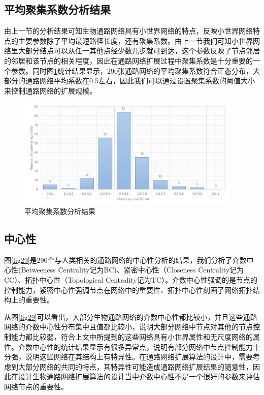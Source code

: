 \subsection{平均聚集系数分析结果}

由上一节的分析结果可知生物通路网络具有小世界网络的特点，反映小世界网络特点的主要参数除了平均最短路径长度，还有聚集系数。由上一节我们可知小世界网络里大部分结点可以从任一其他点经少数几步就可到达，这个参数反映了节点邻居的邻居和该节点的相关程度，因此在通路网络扩展过程中聚集系数是十分重要的一个参数。同时图\ref{fig28}统计结果显示，290张通路网络的平均聚集系数符合正态分布，大部分的通路网络平均系数在0.5左右，因此我们可以通过设置聚集系数的阈值大小来控制通路网络的扩展规模。
\begin{figure}[h]
\centering
\includegraphics[width = 0.95\textwidth]{cc}
\caption[fig28]{平均聚集系数分析结果}
\label{fig28}
\end{figure}

\subsection{中心性}
图\ref{fig29}是290个与人类相关的通路网络的中心性分析的结果，我们分析了介数中心性(Betweeness Centrality记为BC)、紧密中心性（Closeness Centrality记为CC）、拓扑中心性（Topological Centrality记为TC）。介数中心性强调的是节点的控制能力，紧密中心性强调节点在网络中的重要性、拓扑中心性刻画了网络拓扑结构上的重要性。

从图\ref{fig29}可以看出，大部分生物通路网络的介数中心性都比较小，并且这些通路网络的介数中心性分布集中且值都比较小，说明大部分网络中节点对其他的节点控制能力都比较弱，符合上文中所提到的这些网络具有小世界属性和无尺度网络的属性。介数中心性的统计结果显示有很多异常点，说明有部分网络中节点控制能力十分强，说明这些网络在其结构上有特异性。在通路网络扩展算法的设计中，需要考虑到大部分网络的共同的特点，其特异性可能造成通路网络扩展结果的随意性，因此在设计生物通路网络扩展算法的设计当中介数中心性不是一个很好的参数来评估网络节点的重要性。

